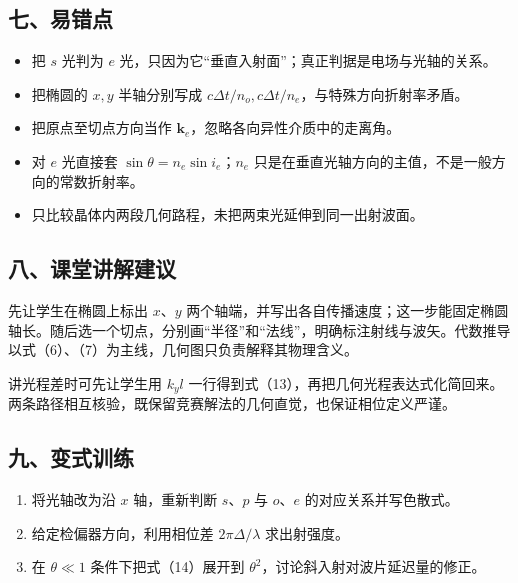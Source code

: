 \documentclass[12pt,a4paper,UTF8]{ctexart}
\newcommand{\tightlist}{\setlength{\itemsep}{0pt}\setlength{\parskip}{0pt}}
\begin{document}
\subsection{七、易错点}\label{ux4e03ux6613ux9519ux70b9-6}

\begin{itemize}
\tightlist
\item
  把 \(s\) 光判为 \(e\)
  光，只因为它``垂直入射面''；真正判据是电场与光轴的关系。
\item
  把椭圆的 \(x,y\) 半轴分别写成
  \(c\Delta t/n_o,c\Delta t/n_e\)，与特殊方向折射率矛盾。
\item
  把原点至切点方向当作 \(\bm k_e\)，忽略各向异性介质中的走离角。
\item
  对 \(e\) 光直接套 \(\sin\theta=n_e\sin i_e\)；\(n_e\)
  只是在垂直光轴方向的主值，不是一般方向的常数折射率。
\item
  只比较晶体内两段几何路程，未把两束光延伸到同一出射波面。
\end{itemize}

\subsection{八、课堂讲解建议}\label{ux516bux8bfeux5802ux8bb2ux89e3ux5efaux8bae-6}

先让学生在椭圆上标出 \(x\)、\(y\)
两个轴端，并写出各自传播速度；这一步能固定椭圆轴长。随后选一个切点，分别画``半径''和``法线''，明确标注射线与波矢。代数推导以式（6）、（7）为主线，几何图只负责解释其物理含义。

讲光程差时可先让学生用 \(k_y l\)
一行得到式（13），再把几何光程表达式化简回来。两条路径相互核验，既保留竞赛解法的几何直觉，也保证相位定义严谨。

\subsection{九、变式训练}\label{ux4e5dux53d8ux5f0fux8badux7ec3-6}

\begin{enumerate}
\def\labelenumi{\arabic{enumi}.}
\tightlist
\item
  将光轴改为沿 \(x\) 轴，重新判断 \(s\)、\(p\) 与 \(o\)、\(e\)
  的对应关系并写色散式。
\item
  给定检偏器方向，利用相位差 \(2\pi\Delta/\lambda\) 求出射强度。
\item
  在 \(\theta\ll1\) 条件下把式（14）展开到
  \(\theta^2\)，讨论斜入射对波片延迟量的修正。
\end{enumerate}
\end{document}

